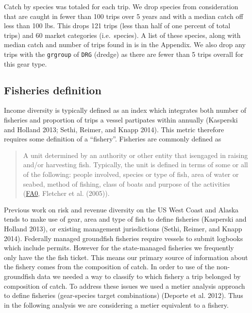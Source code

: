 \documentclass[]{article}
\begin{document}
Catch by species was totaled for each trip. We drop species from
consideration that are caught in fewer than 100 trips over 5 years and
with a median catch off less than 100 lbs. This drops 121 trips (less
than half of one percent of total trips) and 60 market categories
(i.e.~species). A list of these species, along with median catch and
number of trips found in is in the Appendix. We also drop any trips with
the \texttt{grgroup} of \texttt{DRG} (dredge) as there are fewer than 5
trips overall for this gear type.

\subsection{Fisheries definition}\label{fisheries-definition}

Income diversity is typically defined as an index which integrates both
number of fisheries and proportion of trips a vessel partipates within
annually (Kasperski and Holland 2013; Sethi, Reimer, and Knapp 2014).
This metric therefore requires some definition of a ``fishery''.
Fisheries are commonly defined as

\begin{quote}
A unit determined by an authority or other entity that isengaged in
raising and/or harvesting fish. Typically, the unit is defined in terms
of some or all of the following: people involved, species or type of
fish, area of water or seabed, method of fishing, class of boats and
purpose of the activities (\href{http://www.fao.org/fi/glossary/}{FA0},
Fletcher et al. (2005)).
\end{quote}

Previous work on risk and revenue diversity on the US West Coast and
Alaska tends to make use of gear, area and type of fish to define
fisheries (Kasperski and Holland 2013), or existing management
jurisdictions (Sethi, Reimer, and Knapp 2014). Federally managed
groundfish fisheries require vessels to submit logbooks which include
permits. However for the state-managed fisheries we frequently only have
the the fish ticket. This means our primary source of information about
the fishery comes from the composition of catch. In order to use of the
non-groundfish data we needed a way to classify to which fishery a trip
belonged by composition of catch. To address these issues we used a
metier analysis approach to define fisheries (gear-species target
combinations) (Deporte et al. 2012). Thus in the following analysis we
are considering a metier equivalent to a fishery.
\end{document}
